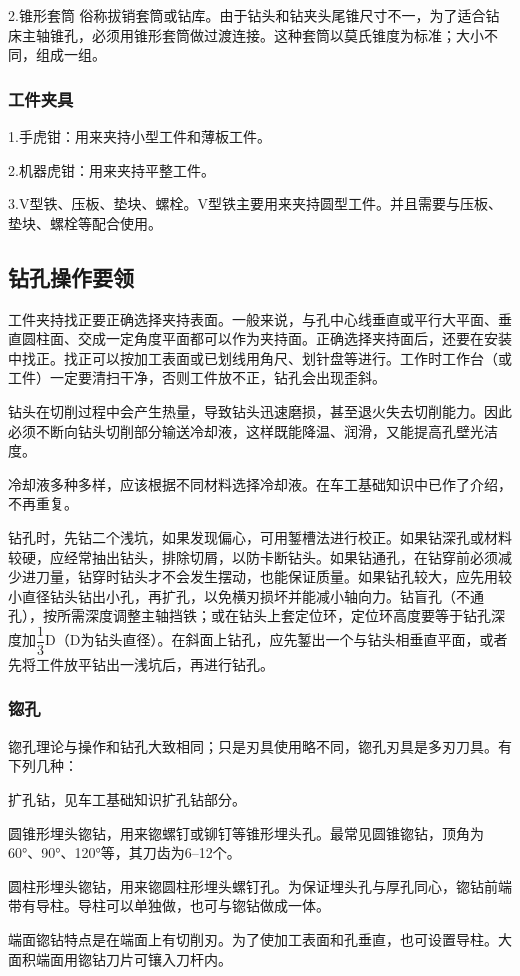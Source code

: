 \documentclass{ctexbook}
\begin{document}
2.锥形套筒 俗称拔销套筒或钻库。由于钻头和钻夹头尾锥尺寸不一，为了适合钻床主轴锥孔，必须用锥形套筒做过渡连接。这种套筒以莫氏锥度为标准；大小不同，组成一组。
\subsubsection{工件夹具}
1.手虎钳：用来夹持小型工件和薄板工件。

2.机器虎钳：用来夹持平整工件。

3.V型铁、压板、垫块、螺栓。V型铁主要用来夹持圆型工件。并且需要与压板、垫块、螺栓等配合使用。
\subsection{钻孔操作要领}
工件夹持找正要正确选择夹持表面。一般来说，与孔中心线垂直或平行大平面、垂直圆柱面、交成一定角度平面都可以作为夹持面。正确选择夹持面后，还要在安装中找正。找正可以按加工表面或已划线用角尺、划针盘等进行。工作时工作台（或工件）一定要清扫干净，否则工件放不正，钻孔会出现歪斜。

钻头在切削过程中会产生热量，导致钻头迅速磨损，甚至退火失去切削能力。因此必须不断向钻头切削部分输送冷却液，这样既能降温、润滑，又能提高孔壁光洁度。

冷却液多种多样，应该根据不同材料选择冷却液。在车工基础知识中已作了介绍，不再重复。

钻孔时，先钻二个浅坑，如果发现偏心，可用錾槽法进行校正。如果钻深孔或材料较硬，应经常抽出钻头，排除切屑，以防卡断钻头。如果钻通孔，在钻穿前必须减少进刀量，钻穿时钻头才不会发生摆动，也能保证质量。如果钻孔较大，应先用较小直径钻头钻出小孔，再扩孔，以免横刃损坏并能减小轴向力。钻盲孔（不通孔），按所需深度调整主轴挡铁；或在钻头上套定位环，定位环高度要等于钻孔深度加$\dfrac{1}{3}$D（D为钻头直径）。在斜面上钻孔，应先錾出一个与钻头相垂直平面，或者先将工件放平钻出一浅坑后，再进行钻孔。
\subsubsection{锪孔}
锪孔理论与操作和钻孔大致相同；只是刃具使用略不同，锪孔刃具是多刃刀具。有下列几种：

扩孔钻，见车工基础知识扩孔钻部分。

圆锥形埋头锪钻，用来锪螺钉或铆钉等锥形埋头孔。最常见圆锥锪钻，顶角为60°、90°、120°等，其刀齿为6--12个。

圆柱形埋头锪钻，用来锪圆柱形埋头螺钉孔。为保证埋头孔与厚孔同心，锪钻前端带有导柱。导柱可以单独做，也可与锪钻做成一体。

端面锪钻特点是在端面上有切削刃。为了使加工表面和孔垂直，也可设置导柱。大面积端面用锪钻刀片可镶入刀杆内。
\end{document}
